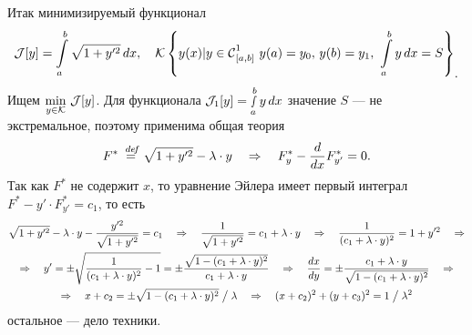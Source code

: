 Итак минимизируемый функционал
\begin{equation*}
	\hfill\J[y]=\int\limits_a^b\sqrt{1+y^{\prime2}}\,dx,\quad
	\K\left\{y(x)|y\in\Cfn[{[a,b]}]{1}\ y(a)=y_0,\,y(b)=y_1,\ \int\limits_a^b y\,dx=S\right\}_{\displaystyle.}\hfill
\end{equation*}
Ищем $\min\limits_{y\in\mathcal{K}}\,\mathcal{J}[y]$. Для функционала $\mathcal{J}_1[y]=\smallint\limits_a^b y\,dx$ значение $S$ --- не экстремальное, поэтому применима общая теория
\begin{equation*}
	\hfill F^{\ast}\eqdef\sqrt{1+y^{\prime2}}-\lambda\cdot y\quad\Rightarrow\quad F^{\ast}_{y}-\der{}{x}F^{\ast}_{y'}=0.\hfill
\end{equation*}
Так как $F^{\ast}$ не содержит $x$, то уравнение Эйлера имеет первый интеграл $F^{\ast}-y'\cdot F^{\ast}_{y'}=c_1$, то есть
\begin{gather*}
	\sqrt{1+y^{\prime2}}-\lambda\cdot y-\frac{y^{\prime2}}{\sqrt{1+y^{\prime2}}}=c_1\quad\Rightarrow\quad
	\frac{1}{\sqrt{1+y^{\prime2}}}=c_1+\lambda\cdot y\quad\Rightarrow\quad\frac{1}{(c_1+\lambda\cdot y)^2}=1+y^{\prime2}\quad\Rightarrow\\\Rightarrow\quad y'=\pm\sqrt{\frac{1}{(c_1+\lambda\cdot y)^2}-1}=\pm\frac{\sqrt{1-(c_1+\lambda\cdot y)^2}}{c_1+\lambda\cdot y}\quad\Rightarrow\quad\frac{dx}{dy}=\pm\frac{c_1+\lambda\cdot y}{\sqrt{1-(c_1+\lambda\cdot y)^2}}\quad\Rightarrow\\\Rightarrow\quad x+c_2=\pm\sqrt{1-(c_1+\lambda\cdot y)^2}\bigm/\lambda\quad\Rightarrow\quad (x+c_2)^2+(y+c_3)^2=1\bigm/\lambda^2
\end{gather*}
остальное --- дело техники.

